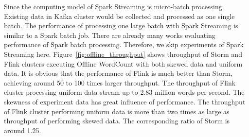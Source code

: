 Since the computing model of Spark Streaming is micro-batch processing. Existing data in Kafka cluster would be collected and processed as one single batch. The performance of processing one large batch with Spark Streaming is similar to a Spark batch job. There are already many works evaluating performance of Spark batch processing. Therefore, we skip experiments of Spark Streaming here. Figure~\ref{fig:offline_throughput} shows throughput of Storm and Flink clusters executing Offline WordCount with both skewed data and uniform data. It is obvious that the performance of Flink is much better than Storm, achieving around 50 to 100 times larger throughput. The throughput of Flink cluster processing uniform data stream up to 2.83 million words per second.  The skewness of experiment data has great influence of performance. The throughput of Flink cluster performing uniform data is more than two times as large as throughput of performing skewed data. The corresponding ratio of Storm is around 1.25. 

